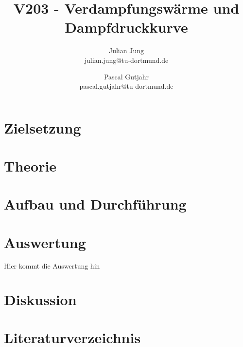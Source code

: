


\title{V203 - Verdampfungswärme und Dampfdruckkurve}
\author{Julian Jung \\ julian.jung@tu-dortmund.de
  \and Pascal Gutjahr \\ pascal.gutjahr@tu-dortmund.de}
\maketitle
\newpage
\tableofcontents
\newpage
\section{Zielsetzung}
\section{Theorie}
\section{Aufbau und Durchführung}
\section{Auswertung}
Hier kommt die Auswertung hin

\section{Diskussion}
\section{Literaturverzeichnis}


